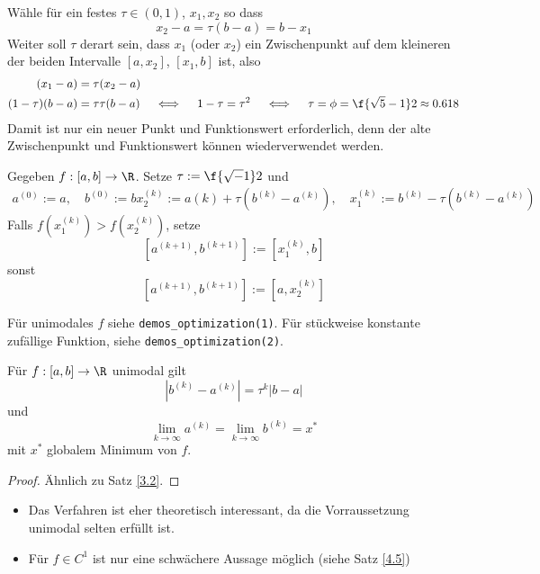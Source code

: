 \documentclass[11pt]{scrartcl}
\begin{document}
\begin{seg}
	Wähle für ein festes $\tau \in (0,1)$, $x_1, x_2$ so dass
	\[
		x_2-a = \tau (b-a) = b-x_1
	\]
	Weiter soll $\tau$ derart sein, dass $x_1$ (oder $x_2$) ein Zwischenpunkt auf dem kleineren der beiden Intervalle $[a,x_2]$, $[x_1,b]$ ist, also
	\begin{align*}
		(x_1 - a) &= \tau (x_2 - a) \\
		(1-\tau)(b-a) &= \tau \tau (b-a)
		\quad \iff \quad 1 - \tau = \tau^2 \quad\iff\quad \tau = \phi = \f{\sqrt 5 - 1}2 \approx 0.618
	\end{align*}
	Damit ist nur ein neuer Punkt und Funktionswert erforderlich, denn der alte Zwischenpunkt und Funktionswert können wiederverwendet werden.
\end{seg}

\begin{df} \label{4.3}
	Gegeben $f:[a,b] \to \R$.
	Setze $\tau := \f {\sqrt - 1}2$ und
	\begin{gather*}
		a^{(0)} := a, \quad b^{(0)} := b
		x_2^{(k)} := a{(k)} + \tau(b^{(k)}-a^{(k)}), \quad x_1^{(k)} := b^{(k)} - \tau(b^{(k)}-a^{(k)})
	\end{gather*}
	Falls $f(x_1^{(k)}) > f(x_2^{(k)})$, setze
	\[
		[a^{(k+1)},b^{(k+1)}] := [x_1^{(k)}, b]
	\]
	sonst
	\[
		[a^{(k+1)},b^{(k+1)}] := [a, x_2^{(k)}]
	\]
\end{df}

\begin{ex*}
	Für unimodales $f$ siehe \verb|demos_optimization(1)|.
	Für stückweise konstante zufällige Funktion, siehe \verb|demos_optimization(2)|.
\end{ex*}

\begin{st} \label{4.4}
	Für $f: [a,b] \to \R$ unimodal gilt
	\[
		|b^{(k)} - a^{(k)}| = \tau^k |b-a|
	\]
	und
	\[
		\lim_{k\to \infty} a^{(k)} = \lim_{k\to \infty} b^{(k)} = x^*
	\]
	mit $x^*$ globalem Minimum von $f$.
	\begin{proof}
		Ähnlich zu Satz \ref{3.2}.
	\end{proof}
	\begin{note}
		\begin{itemize}
			\item
				Das Verfahren ist eher theoretisch interessant, da die Vorraussetzung unimodal selten erfüllt ist.
			\item
				Für $f\in C^1$ ist nur eine schwächere Aussage möglich (siehe Satz \ref{4.5})
		\end{itemize}
	\end{note}
\end{st}
\end{document}

